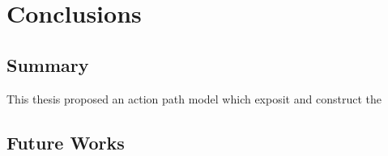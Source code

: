 \section{Conclusions}
\label{ch:final}

\subsection{Summary}





This thesis proposed an action path model which exposit and construct the 

\subsection{Future Works}




\cleardoublepage